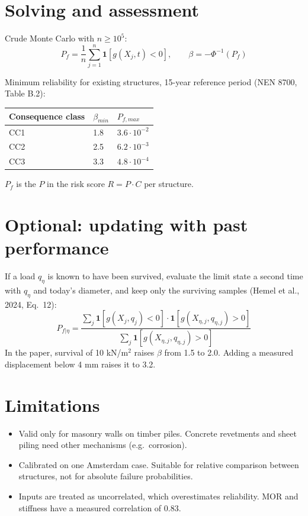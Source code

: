 \section{Solving and assessment}
Crude Monte Carlo with $n \geq 10^5$:
\begin{equation}
P_f = \frac{1}{n}\sum_{j=1}^{n} \mathbf{1}\left[g(X_j,t) < 0\right], \qquad \beta = -\Phi^{-1}(P_f)
\end{equation}

Minimum reliability for existing structures, 15-year reference period (NEN 8700, Table B.2):

\begin{tabular}{lll}
\toprule
Consequence class & $\beta_{min}$ & $P_{f,max}$ \\
\midrule
CC1 & 1.8 & $3.6\cdot10^{-2}$ \\
CC2 & 2.5 & $6.2\cdot10^{-3}$ \\
CC3 & 3.3 & $4.8\cdot10^{-4}$ \\
\bottomrule
\end{tabular}

$P_f$ is the $P$ in the risk score $R = P \cdot C$ per structure.

\section{Optional: updating with past performance}
If a load $q_\eta$ is known to have been survived, evaluate the limit state a second time with $q_\eta$ and today's diameter, and keep only the surviving samples (Hemel et al., 2024, Eq.~12):
\begin{equation}
P_{f|\eta} = \frac{\sum_j \mathbf{1}\left[g(X_j,q_j)<0\right]\cdot \mathbf{1}\left[g(X_{\eta,j},q_{\eta,j})>0\right]}{\sum_j \mathbf{1}\left[g(X_{\eta,j},q_{\eta,j})>0\right]}
\end{equation}
In the paper, survival of 10 kN/m$^2$ raises $\beta$ from 1.5 to 2.0. Adding a measured displacement below 4 mm raises it to 3.2.

\section{Limitations}
\begin{itemize}
  \item Valid only for masonry walls on timber piles. Concrete revetments and sheet piling need other mechanisms (e.g.\ corrosion).
  \item Calibrated on one Amsterdam case. Suitable for relative comparison between structures, not for absolute failure probabilities.
  \item Inputs are treated as uncorrelated, which overestimates reliability. MOR and stiffness have a measured correlation of 0.83.
\end{itemize}